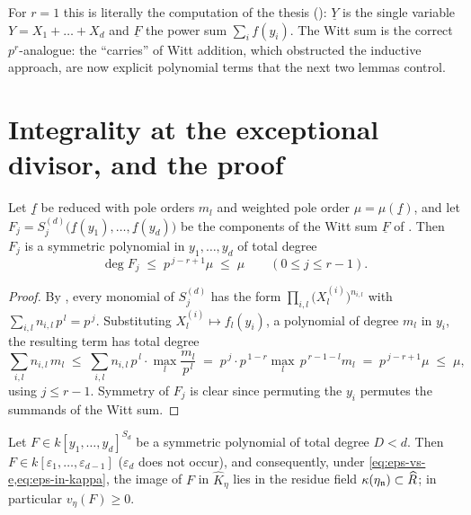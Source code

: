 \documentclass[11pt]{article}
\providecommand{\eps}{\varepsilon}                  %
\newcommand{\wv}[1]{\underline{#1}}                 %
\begin{document}
\begin{rem*}
For $r=1$ this is literally the computation of the thesis
(): $\wv Y$ is the single
variable $Y=X_1+\dots+X_d$ and $\wv F$ the power sum $\sum_if(y_i)$.  The
Witt sum is the correct $p^r$-analogue: the ``carries'' of Witt addition,
which obstructed the inductive approach, are now explicit polynomial terms
that the next two lemmas control.
\end{rem*}

\section{Integrality at the exceptional divisor, and the proof}\label{sec:proof}

\begin{lemma}\label{lem:isobaric-bound}
Let $\wv f$ be reduced with pole orders $m_l$ and weighted pole order
$\mu=\mu(\wv f)$, and let
$F_j=S^{(d)}_j\big(\wv f(y_1),\dots,\wv f(y_d)\big)$ be the components of
the Witt sum $\wv F$ of .  Then $F_j$ is a symmetric
polynomial in $y_1,\dots,y_d$ of total degree
\[
\deg F_j\;\le\;p^{\,j-r+1}\mu\;\le\;\mu
\qquad(0\le j\le r-1).
\]
\end{lemma}

\begin{proof}
By , every monomial of $S^{(d)}_j$ has the form
$\prod_{i,l}\big(X^{(i)}_l\big)^{n_{i,l}}$ with
$\sum_{i,l}n_{i,l}\,p^{\,l}=p^{\,j}$.  Substituting
$X^{(i)}_l\mapsto f_l(y_i)$, a polynomial of degree $m_l$ in $y_i$, the
resulting term has total degree
\[
\sum_{i,l}n_{i,l}\,m_l
\;\le\;\sum_{i,l}n_{i,l}\,p^{\,l}\cdot\max_{l}\frac{m_l}{p^{\,l}}
\;=\;p^{\,j}\cdot p^{\,1-r}\max_l\,p^{\,r-1-l}m_l
\;=\;p^{\,j-r+1}\mu\;\le\;\mu,
\]
using $j\le r-1$.  Symmetry of $F_j$ is clear since permuting the $y_i$
permutes the summands of the Witt sum.
\end{proof}

\begin{lemma}\label{lem:integrality}
Let $F\in k[y_1,\dots,y_d]^{S_d}$ be a symmetric polynomial of total degree
$D<d$.  Then $F\in k[\eps_1,\dots,\eps_{d-1}]$ ($\eps_d$ does not occur),
and consequently, under \cref{eq:eps-vs-e,eq:eps-in-kappa}, the image of
$F$ in $\widehat K_\eta$ lies in the residue field
$\kappa(\eta_{\mathfrak{n}})\subset\widehat R$; in particular $v_\eta(F)\ge0$.
\end{lemma}
\end{document}
